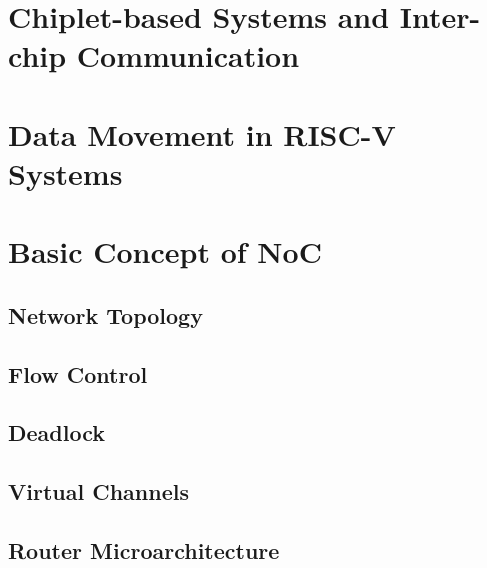 \label{ch2:background}

\section{Chiplet-based Systems and Inter-chip Communication}


\section{Data Movement in RISC-V Systems}


\section{Basic Concept of NoC}


\subsection{Network Topology}


\subsection{Flow Control}


\subsection{Deadlock}


\subsection{Virtual Channels}


\subsection{Router Microarchitecture}

